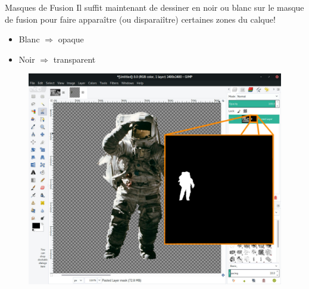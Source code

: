 \documentclass[10pt,svgnames,usenames,table]{beamer}
\begin{document}
	\begin{frame}{Masques de Fusion}
		Il suffit maintenant de dessiner en noir ou blanc sur le masque de fusion pour faire apparaître (ou disparaiître) certaines zones du calque!
		\begin{itemize}
			\item Blanc $\Longrightarrow $ opaque
			\item Noir $ \Longrightarrow $ transparent
		\end{itemize}
		\begin{center}
			\begin{figure}
				\includegraphics[scale=.15]{Images/mask/mask3}	
			\end{figure}
		\end{center}
	\end{frame}
\end{document}
